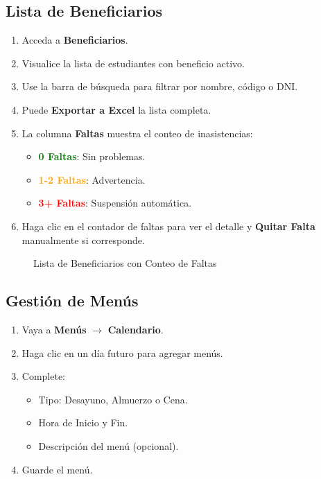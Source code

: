 \documentclass[12pt,a4paper]{article}
\begin{document}
\subsection{Lista de Beneficiarios}
\begin{enumerate}
    \item Acceda a \textbf{Beneficiarios}.
    \item Visualice la lista de estudiantes con beneficio activo.
    \item Use la barra de búsqueda para filtrar por nombre, código o DNI.
    \item Puede \textbf{Exportar a Excel} la lista completa.
    \item La columna \textbf{Faltas} muestra el conteo de inasistencias:
    \begin{itemize}
        \item \textcolor{green}{\textbf{0 Faltas}}: Sin problemas.
        \item \textcolor{orange}{\textbf{1-2 Faltas}}: Advertencia.
        \item \textcolor{red}{\textbf{3+ Faltas}}: Suspensión automática.
    \end{itemize}
    \item Haga clic en el contador de faltas para ver el detalle y \textbf{Quitar Falta} manualmente si corresponde.
\end{enumerate}

\begin{figure}[h]
    \centering
    \caption{Lista de Beneficiarios con Conteo de Faltas}
    \label{fig:beneficiarios}
\end{figure}

\subsection{Gestión de Menús}
\begin{enumerate}
    \item Vaya a \textbf{Menús} $\rightarrow$ \textbf{Calendario}.
    \item Haga clic en un día futuro para agregar menús.
    \item Complete:
    \begin{itemize}
        \item Tipo: Desayuno, Almuerzo o Cena.
        \item Hora de Inicio y Fin.
        \item Descripción del menú (opcional).
    \end{itemize}
    \item Guarde el menú.
\end{enumerate}
\end{document}
